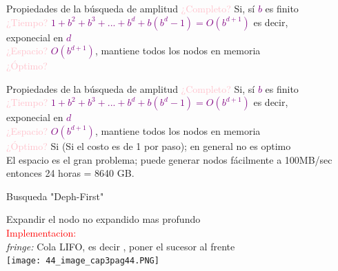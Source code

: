 \documentclass{beamer}
\theoremstyle{definition}
\theoremstyle{theorem}
\theoremstyle{remark}
\begin{document}
\begin{frame}{Propiedades de la búsqueda de amplitud}
    \textcolor{Pink}{¿Completo?} Si, sí \textcolor{Purple}{$b$} es finito \\
    \textcolor{Pink}{¿Tiempo?} \textcolor{Purple}{$1+b^2+b^3+...+b^d+b(b^d-1)=O(b^{d+1})$} es decir,\\    \hspace{9.3cm} exponecial en \textcolor{Purple}{$d$} \\
    \textcolor{Pink}{¿Espacio?} \textcolor{Purple}{$O(b^{d+1})$}, mantiene todos los nodos en memoria \\
    \textcolor{Pink}{¿Óptimo?}
\end{frame}

\begin{frame}{Propiedades de la búsqueda de amplitud}
    \textcolor{Pink}{¿Completo?} Si, sí \textcolor{Purple}{$b$} es finito \\
    \textcolor{Pink}{¿Tiempo?} \textcolor{Purple}{$1+b^2+b^3+...+b^d+b(b^d-1)=O(b^{d+1})$} es decir,\\    \hspace{9.3cm} exponecial en \textcolor{Purple}{$d$} \\
    \textcolor{Pink}{¿Espacio?} \textcolor{Purple}{$O(b^{d+1})$}, mantiene todos los nodos en memoria \\
    \textcolor{Pink}{¿Óptimo?} Si (Si el costo es de 1 por paso); en general no es optimo \\
    El espacio es el gran problema; puede generar nodos fácilmente a 100MB/sec\\
    entonces 24 horas = 8640 GB. \\
\end{frame}

\begin{frame}{Busqueda "Deph-First"}
        
    Expandir el nodo no expandido mas profundo
    \\\textcolor{red}{\large{Implementacion:}}
    \\\qquad\qquad\textit{fringe:} Cola LIFO, es decir , poner el sucesor al frente
    \\
    \centering
    \texttt{[image: 44\_image\_cap3pag44.PNG]}
        
\end{frame}
\end{document}
